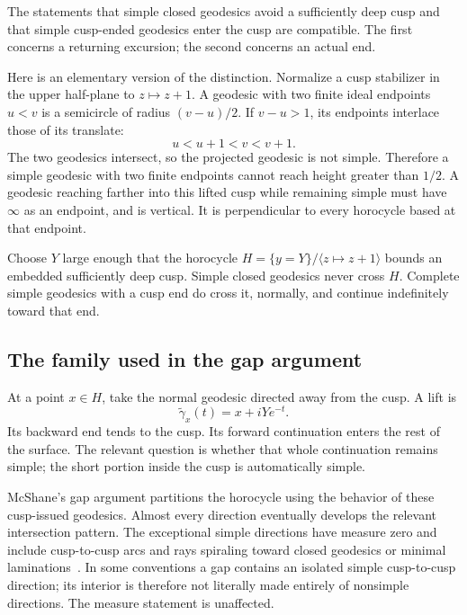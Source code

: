\documentclass[11pt,a4paper]{article}
\numberwithin{equation}{section}
\theoremstyle{definition}
\theoremstyle{remark}
\begin{document}
The statements that simple closed geodesics avoid a sufficiently deep cusp
and that simple cusp-ended geodesics enter the cusp are compatible. The
first concerns a returning excursion; the second concerns an actual end.

Here is an elementary version of the distinction. Normalize a cusp
stabilizer in the upper half-plane to $z\mapsto z+1$. A geodesic with two
finite ideal endpoints $u<v$ is a semicircle of radius $(v-u)/2$. If
$v-u>1$, its endpoints interlace those of its translate:
\[
 u<u+1<v<v+1.
\]
The two geodesics intersect, so the projected geodesic is not simple.
Therefore a simple geodesic with two finite endpoints cannot reach height
greater than $1/2$. A geodesic reaching farther into this lifted cusp
while remaining simple must have $\infty$ as an endpoint, and is vertical.
It is perpendicular to every horocycle based at that endpoint.

Choose $Y$ large enough that the horocycle $H=\{y=Y\}/\langle z\mapsto
z+1\rangle$ bounds an embedded sufficiently deep cusp. Simple closed
geodesics never cross $H$. Complete simple geodesics with a cusp end do
cross it, normally, and continue indefinitely toward that end.

\subsection{The family used in the gap argument}

At a point $x\in H$, take the normal geodesic directed away from the
cusp. A lift is
\begin{equation}
 \widetilde\gamma_x(t)=x+iYe^{-t}.
 \label{eq:cuspray}
\end{equation}
Its backward end tends to the cusp. Its forward continuation enters the
rest of the surface. The relevant question is whether that whole
continuation remains simple; the short portion inside the cusp is
automatically simple.

McShane's gap argument partitions the horocycle using the behavior of
these cusp-issued geodesics. Almost every direction eventually develops
the relevant intersection pattern. The exceptional simple directions
have measure zero and include cusp-to-cusp arcs and rays spiraling toward
closed geodesics or minimal laminations~\cite{McShane,McShanePants}.
In some conventions a gap contains an isolated simple cusp-to-cusp
direction; its interior is therefore not literally made entirely of
nonsimple directions. The measure statement is unaffected.
\end{document}

